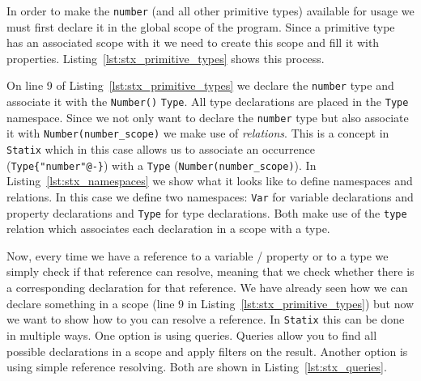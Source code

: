 \documentclass{article}
\newcommand{\ttt}[1]{\texttt{#1}}
\begin{document}
In order to make the \ttt{number} (and all other primitive types) available for usage we must first declare it in the global scope of the program.
Since a primitive type has an associated scope with it we need to create this scope and fill it with properties.
Listing~\ref{lst:stx_primitive_types} shows this process.
\noindent
\begin{center}
    \begin{minipage}{.95\textwidth}
    
    \end{minipage}
\end{center}
On line 9 of Listing~\ref{lst:stx_primitive_types} we declare the \ttt{number} type and associate it with the \ttt{Number()} \ttt{Type}.
All type declarations are placed in the \ttt{Type} namespace.
Since we not only want to declare the \ttt{number} type but also associate it with \ttt{Number(number\_scope)} we make use of \textit{relations}.
This is a concept in \ttt{Statix} which in this case allows us to associate an occurrence (\ttt{Type\{"number"@-\}}) with a \ttt{Type} (\ttt{Number(number\_scope)}).
In Listing~\ref{lst:stx_namespaces} we show what it looks like to define namespaces and relations.
In this case we define two namespaces: \ttt{Var} for variable declarations and property declarations and \ttt{Type} for type declarations.
Both make use of the \ttt{type} relation which associates each declaration in a scope with a type.
\noindent
\begin{center}
    \begin{minipage}{.40\textwidth}
    
    \end{minipage}
\end{center}
Now, every time we have a reference to a variable / property or to a type we simply check if that reference can resolve, meaning that we check whether there is a corresponding declaration for that reference.
We have already seen how we can declare something in a scope (line 9 in Listing~\ref{lst:stx_primitive_types}) but now we want to show how to you can resolve a reference.
In \ttt{Statix} this can be done in multiple ways.
One option is using queries.
Queries allow you to find all possible declarations in a scope and apply filters on the result.
Another option is using simple reference resolving.
Both are shown in Listing~\ref{lst:stx_queries}.
\noindent
\begin{center}
    \begin{minipage}{.90\textwidth}
    
    \end{minipage}
\end{center}
\end{document}
